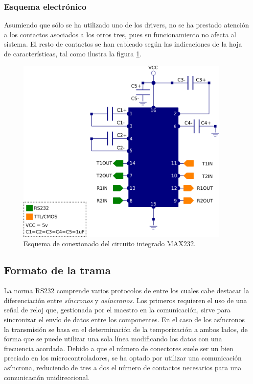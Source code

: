 \subsubsection{Esquema electrónico}

Asumiendo que sólo se ha utilizado uno de los drivers, no se ha prestado atención a los contactos asociados a los otros tres, pues su funcionamiento no afecta al sistema. El resto de contactos se han cableado según las indicaciones de la hoja de características, tal como ilustra la figura \ref{fig:esq_max232}.

\begin{figure}[!htp]
\centering
\includegraphics[width=300pt]{./images/esq_max232.png}
\caption{Esquema de conexionado del circuito integrado MAX232.}
\label{fig:esq_max232}
\end{figure}

\subsection{Formato de la trama}
\label{subsec:trama}

La norma RS232 comprende varios protocolos de entre los cuales cabe destacar la diferenciación entre \textit{síncronos} y \textit{asíncronos}. Los primeros requieren el uso de una señal de reloj que, gestionada por el maestro en la comunicación, sirve para sincronizar el envío de datos entre los componentes. En el caso de los asíncronos la transmisión se basa en el determinación de la temporización a ambos lados, de forma que se puede utilizar una sola línea modificando los datos con una frecuencia acordada.  Debido a que el número de conectores suele ser un bien preciado en los microcontroladores, se ha optado por utilizar una comunicación asíncrona, reduciendo de tres a dos el número de contactos necesarios para una comunicación unidireccional.

